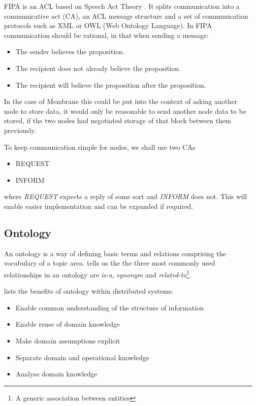 \documentclass[11pt, a4paper, twoside]{report}
\begin{document}
FIPA is an ACL based on Speech Act Theory \citep{labrou1999agent}. It splits communication into a communicative act (CA), an ACL message structure and a set of communication protocols such as XML or OWL (Web Ontology Language). In FIPA communication should be rational, in that when sending a message:

\begin{itemize}
  \item The sender believes the proposition.
  \item The recipient does not already believe the proposition.
  \item The recipient will believe the proposition after the proposition.
\end{itemize}

In the case of Membrane this could be put into the context of asking another node to store data, it would only be reasonable to send another node data to be stored, if the two nodes had negotiated storage of that block between them previously.

To keep communication simple for nodes, we shall use two CAs

\begin{itemize}
  \item REQUEST
  \item INFORM
\end{itemize}

where \emph{REQUEST} expects a reply of some sort and \emph{INFORM} does not. This will enable easier implementation and can be expanded if required.

\subsection{Ontology} \label{sec:ontology}

An ontology is a way of defining basic terms and relations comprising the vocabulary of a topic area. \cite{sugumaran2002ontologies} tells us the the three most commonly used relationships in an ontology are \emph{is-a}, \emph{synonym} and \emph{related-to}\footnote{A generic association between entities}. 

\cite{noy2001ontology} lists the benefits of ontology within distributed systems:

\begin{itemize}
 \item Enable common understanding of the structure of information
 \item Enable reuse of domain knowledge
 \item Make domain assumptions explicit
 \item Separate domain and operational knowledge
 \item Analyse domain knowledge
\end{itemize}
\end{document}
